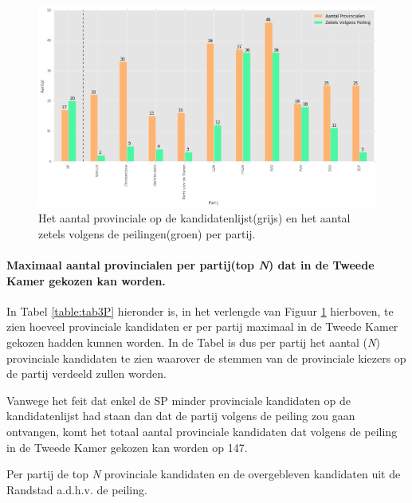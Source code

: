  
\begin{figure}[H]

	\includegraphics[width=\linewidth]	{Aantal_provincialen_aantal_zetels1.png}

			\caption{Het aantal provinciale op de kandidatenlijst(grijs) en het aantal zetels volgens de peilingen(groen) per partij.}

\label{fig:zetelsP}
\end{figure}

\paragraph{Maximaal aantal provincialen per partij(top \textit{N}) dat in de Tweede Kamer gekozen kan worden.}
In Tabel \ref{table:tab3P} hieronder is, in het verlengde van Figuur \ref{fig:zetelsP}  hierboven, te zien hoeveel provinciale kandidaten er per partij maximaal in de Tweede Kamer gekozen hadden kunnen worden. In de Tabel is dus per partij het aantal (\textit{N}) provinciale kandidaten te zien waarover de stemmen van de provinciale kiezers op de partij verdeeld zullen worden.  

Vanwege het feit dat enkel de SP minder provinciale kandidaten op de kandidatenlijst had staan dan dat de partij volgens de peiling zou gaan ontvangen, komt het totaal aantal provinciale kandidaten dat volgens de peiling in de Tweede Kamer gekozen kan worden op 147.




\begin{table}[h]
\centering
	\begin{footnotesize}
		
	\end{footnotesize}
			\caption{Per partij de top \textit{N} provinciale kandidaten en de overgebleven kandidaten uit de Randstad a.d.h.v. de peiling.}
\label{table:tab3P} 
\end{table}



